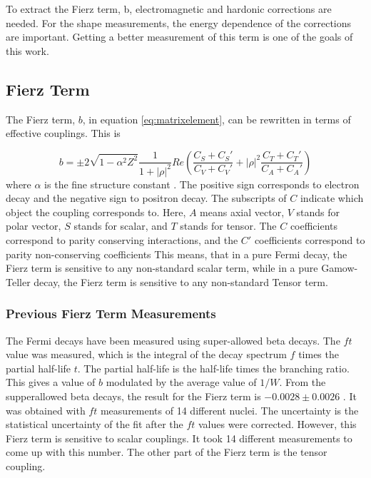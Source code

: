 \documentclass[../MaxHughesThesis.tex]{subfiles}
\begin{document}
To extract the Fierz term, b, electromagnetic and hardonic corrections are needed.
For the shape measurements, the energy dependence of the corrections are important.
Getting a better measurement of this term is one of the goals of this work.

\subsection{Fierz Term}
The Fierz term, $b$, in equation \ref{eq:matrixelement}, can be rewritten in terms of effective couplings.
This is %

\begin{equation}
	b =  \pm 2 \sqrt{1 - \alpha^{2}{Z^{2}}}\frac{1}{1 + |\rho|^{2}}Re(\frac{C_{S} + C_{S}'}{C_{V} + C_{V}'} + |\rho|^{2}\frac{C_{T} + C_{T}'}{C_{A} + C_{A}'})
	\label{eq:bwrittenout}
\end{equation}
where $\alpha$ is the fine structure constant \cite{Jack57}.
The positive sign corresponds to electron decay and the negative sign to positron decay.  
The subscripts of $C$ indicate which object the coupling corresponds to. 
Here, $A$ means axial vector, $V$ stands for polar vector, $S$ stands for scalar, and $T$ stands for tensor. 
The $C$ coefficients correspond to parity conserving interactions, and the $C'$ coefficients correspond to parity non-conserving coefficients \cite{Lee56}
This means, that in a pure Fermi decay, the Fierz term is sensitive to any non-standard scalar term, while in a pure Gamow-Teller decay, the Fierz term is sensitive to any non-standard Tensor term. 

\subsubsection{Previous Fierz Term Measurements}
The Fermi decays have been measured using super-allowed beta decays.
The $ft$ value was measured, which is the integral of the decay spectrum $f$ times the partial half-life $t$.
The partial half-life is the half-life times the branching ratio.
This gives a value of $b$ modulated by the average value of $1/W$.
From the supperallowed beta decays, the result for the Fierz term is $-0.0028 \pm 0.0026$ \cite{Har17}.
It was obtained with $ft$ measurements of 14 different nuclei.
The uncertainty is the statistical uncertainty of the fit after the $ft$ values were corrected.
However, this Fierz term is sensitive to scalar couplings.
It took 14 different measurements to come up with this number.
The other part of the Fierz term is the tensor coupling. 
\end{document}
